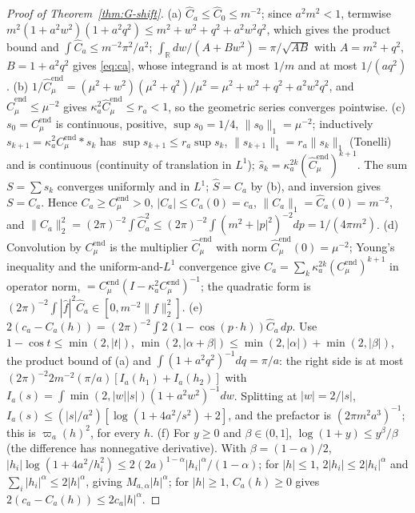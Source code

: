 \documentclass[11pt]{article}
\theoremstyle{plain}
\theoremstyle{definition}
\theoremstyle{remark}
\newcommand{\R}{\mathbb{R}}
\newcommand{\Cend}{C^{\mathrm{end}}_{\mu}}
\newcommand{\hCend}{\hat C^{\mathrm{end}}_{\mu}}
\begin{document}
\begin{proof}[Proof of Theorem~\ref{thm:G-shift}]
(a) $\hat C_a\le\hat C_0\le m^{-2}$; since $a^{2}m^{2}<1$, termwise
$m^{2}(1+a^{2}w^{2})(1+a^{2}q^{2})\le m^{2}+w^{2}+q^{2}+a^{2}w^{2}q^{2}$, which gives the product bound and
$\int\hat C_a\le m^{-2}\pi^{2}/a^{2}$; $\int_\R dw/(A+Bw^{2})=\pi/\sqrt{AB}$ with $A=m^{2}+q^{2}$, $B=1+a^{2}q^{2}$ gives
\eqref{eq:ca}, whose integrand is at most $1/m$ and at most $1/(aq^{2})$.
(b) $1/\hCend=(\mu^{2}+w^{2})(\mu^{2}+q^{2})/\mu^{2}=\mu^{2}+w^{2}+q^{2}+a^{2}w^{2}q^{2}$, and $\hCend\le\mu^{-2}$ gives
$\kappa_a^{2}\hCend\le r_a<1$, so the geometric series converges pointwise.
(c) $s_0=\Cend$ is continuous, positive, $\sup s_0=1/4$, $\|s_0\|_1=\mu^{-2}$; inductively
$s_{k+1}=\kappa_a^{2}\Cend*s_k$ has $\sup s_{k+1}\le r_a\sup s_k$, $\|s_{k+1}\|_1=r_a\|s_k\|_1$ (Tonelli) and is
continuous (continuity of translation in $L^{1}$); $\hat s_k=\kappa_a^{2k}(\hCend)^{k+1}$. The sum
$S=\sum s_k$ converges uniformly and in $L^{1}$; $\hat S=\hat C_a$ by (b), and inversion gives
$S=C_a$. Hence $C_a\ge\Cend>0$, $|C_a|\le C_a(0)=c_a$, $\|C_a\|_1=\hat C_a(0)=m^{-2}$, and
$\|C_a\|_2^{2}=(2\pi)^{-2}\int\hat C_a^{2}\le(2\pi)^{-2}\int(m^{2}+|p|^{2})^{-2}dp=1/(4\pi m^{2})$.
(d) Convolution by $\Cend$ is the multiplier $\hCend$ with norm $\hCend(0)=\mu^{-2}$; Young's
inequality and the uniform-and-$L^{1}$ convergence give $C_a=\sum_k\kappa_a^{2k}(\Cend)^{k+1}$ in operator
norm, $=\Cend(I-\kappa_a^{2}\Cend)^{-1}$; the quadratic form is
$(2\pi)^{-2}\int|\hat f|^{2}\hat C_a\in[0,m^{-2}\|f\|_2^{2}]$.
(e) $2(c_a-C_a(h))=(2\pi)^{-2}\int2(1-\cos(p\cdot h))\hat C_a\,dp$. Use $1-\cos t\le\min(2,|t|)$,
$\min(2,|\alpha+\beta|)\le\min(2,|\alpha|)+\min(2,|\beta|)$, the product bound of (a) and
$\int(1+a^{2}q^{2})^{-1}dq=\pi/a$: the right side is at most
$(2\pi)^{-2}2m^{-2}(\pi/a)[I_a(h_1)+I_a(h_2)]$ with $I_a(s)=\int\min(2,|w||s|)(1+a^{2}w^{2})^{-1}dw$. Splitting at
$|w|=2/|s|$, $I_a(s)\le(|s|/a^{2})[\log(1+4a^{2}/s^{2})+2]$, and the prefactor is
$(2\pi m^{2}a^{3})^{-1}$; this is $\varpi_a(h)^{2}$, for every $h$.
(f) For $y\ge0$ and $\beta\in(0,1]$, $\log(1+y)\le y^{\beta}/\beta$ (the difference has nonnegative
derivative). With $\beta=(1-\alpha)/2$, $|h_i|\log(1+4a^{2}/h_i^{2})\le2(2a)^{1-\alpha}|h_i|^{\alpha}/(1-\alpha)$; for $|h|\le1$,
$2|h_i|\le2|h_i|^{\alpha}$ and $\sum_i|h_i|^{\alpha}\le2|h|^{\alpha}$, giving $M_{a,\alpha}|h|^{\alpha}$; for $|h|\ge1$, $C_a(h)\ge0$ gives
$2(c_a-C_a(h))\le2c_a|h|^{\alpha}$.
\end{proof}
\end{document}

